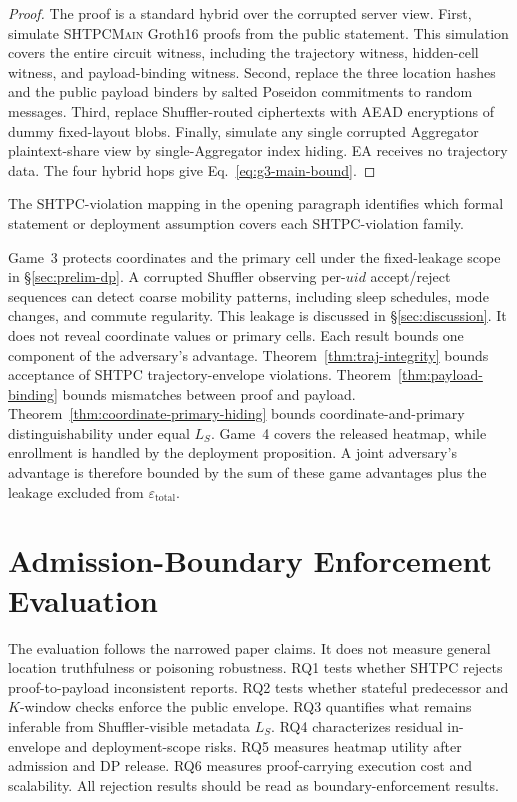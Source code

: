 \documentclass[journal]{IEEEtran}
\theoremstyle{definition}
\theoremstyle{plain}
\begin{document}
\begin{proof}
  The proof is a standard hybrid over the corrupted server view. First, simulate
  \textsc{SHTPCMain} Groth16 proofs from the public statement. This simulation
  covers the entire circuit witness, including the trajectory witness,
  hidden-cell witness, and payload-binding witness. Second, replace the three
  location hashes and the public payload binders by salted Poseidon commitments
  to random messages. Third, replace Shuffler-routed ciphertexts with AEAD
  encryptions of dummy fixed-layout blobs. Finally, simulate any single
  corrupted Aggregator plaintext-share view by single-Aggregator index hiding.
  EA receives no trajectory data. The four hybrid hops give
  Eq.~\eqref{eq:g3-main-bound}.
\end{proof}

The SHTPC-violation mapping in the opening paragraph identifies which formal
statement or deployment assumption covers each SHTPC-violation family.

Game~3 protects coordinates and the primary cell under the fixed-leakage
scope in \S\ref{sec:prelim-dp}. A corrupted Shuffler observing per-$uid$
accept/reject sequences can detect coarse mobility patterns, including sleep
schedules, mode changes, and commute regularity. This leakage is discussed in
\S\ref{sec:discussion}. It does not reveal coordinate values or primary cells.
Each result bounds one component of the adversary's advantage.
Theorem~\ref{thm:traj-integrity} bounds acceptance of SHTPC trajectory-envelope violations.
Theorem~\ref{thm:payload-binding} bounds mismatches between proof and payload.
Theorem~\ref{thm:coordinate-primary-hiding} bounds coordinate-and-primary
distinguishability under equal \(L_S\). Game~4 covers the released heatmap,
while enrollment is handled by the deployment proposition. A joint adversary's
advantage is therefore bounded by the sum of these game advantages plus the
leakage excluded from
$\varepsilon_{\mathrm{total}}$.
\section{Admission-Boundary Enforcement Evaluation}
\label{sec:eval}

The evaluation follows the narrowed paper claims. It does not measure general
location truthfulness or poisoning robustness. RQ1 tests whether
\textsc{SHTPC} rejects proof-to-payload inconsistent reports. RQ2 tests whether
stateful predecessor and \(K\)-window checks enforce the public envelope. RQ3
quantifies what remains inferable from Shuffler-visible metadata \(L_S\). RQ4
characterizes residual in-envelope and deployment-scope risks. RQ5 measures
heatmap utility after admission and DP release. RQ6 measures proof-carrying
execution cost and scalability.
All rejection results should be read as boundary-enforcement results.
\end{document}
